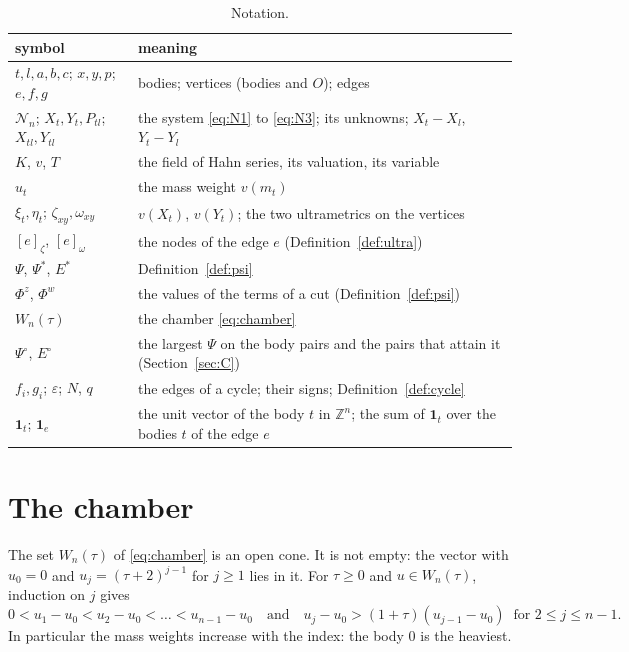 \documentclass[11pt]{amsart}
\theoremstyle{definition}
\theoremstyle{remark}
\numberwithin{equation}{section}
\newcommand{\ZZ}{\mathbb{Z}}
\newcommand{\cN}{\mathcal{N}}
\newcommand{\Ps}{\Psi^{*}}
\newcommand{\Es}{E^{*}}
\newcommand{\Po}{\Psi^{\circ}}
\newcommand{\Eo}{E^{\circ}}
\newcommand{\one}[1]{\mathbf{1}_{#1}}
\newcommand{\nd}[2]{[#1]_{#2}}
\begin{document}
\begin{table}[ht]
\caption{Notation.}\label{tab:notation}
\small
\begin{tabular}{@{}>{\raggedright}p{}>{\raggedright\arraybackslash}p{}@{}}
\toprule
symbol & meaning \\
\midrule
$t, l, a, b, c$; $x, y, p$; $e, f, g$ & bodies; vertices (bodies and $O$); edges \\
$\cN_n$; $X_t, Y_t, P_{tl}$; $X_{tl}, Y_{tl}$ & the system \eqref{eq:N1} to \eqref{eq:N3}; its unknowns; $X_t - X_l$, $Y_t - Y_l$ \\
$K$, $v$, $T$ & the field of Hahn series, its valuation, its variable \\
$u_t$ & the mass weight $v(m_t)$ \\
$\xi_t, \eta_t$; $\zeta_{xy}, \omega_{xy}$ & $v(X_t)$, $v(Y_t)$; the two ultrametrics on the vertices \\
$\nd{e}{\zeta}$, $\nd{e}{\omega}$ & the nodes of the edge $e$ (Definition~\ref{def:ultra}) \\
$\Psi$, $\Ps$, $\Es$ & Definition~\ref{def:psi} \\
$\Phi^z$, $\Phi^w$ & the values of the terms of a cut (Definition~\ref{def:psi}) \\
$W_n(\tau)$ & the chamber \eqref{eq:chamber} \\
$\Po$, $\Eo$ & the largest $\Psi$ on the body pairs and the pairs that attain it (Section~\ref{sec:C}) \\
$f_i, g_i$; $\varepsilon$; $N$, $q$ & the edges of a cycle; their signs; Definition~\ref{def:cycle} \\
$\one{t}$; $\one{e}$ & the unit vector of the body $t$ in $\ZZ^n$; the sum of $\one{t}$ over the bodies $t$ of the edge $e$ \\
\bottomrule
\end{tabular}
\end{table}

\section{The chamber}\label{sec:chamber}

The set $W_n(\tau)$ of \eqref{eq:chamber} is an open cone. It is not empty: the vector with $u_0 = 0$
and $u_j = (\tau + 2)^{j-1}$ for $j \ge 1$ lies in it. For $\tau \ge 0$ and $u \in W_n(\tau)$,
induction on $j$ gives
\begin{equation}\label{eq:mono}
  0 < u_1 - u_0 < u_2 - u_0 < \dots < u_{n-1} - u_0
  \quad\text{and}\quad u_j - u_0 > (1 + \tau)(u_{j-1} - u_0) \ \text{ for } 2 \le j \le n-1 .
\end{equation}
In particular the mass weights increase with the index: the body $0$ is the heaviest.
\end{document}
